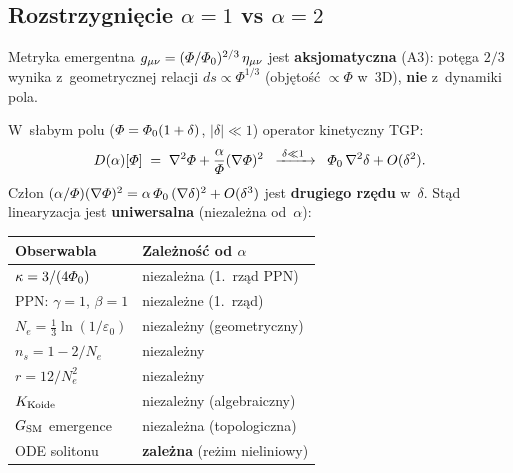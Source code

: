 \subsection{Rozstrzygnięcie $\alpha = 1$ vs $\alpha = 2$}%
\label{ssec:alpha-resolution}

\begin{result}%
\label{res:alpha-independent}
Metryka emergentna $g_{\mu\nu} = (\varPhi/\varPhi_0)^{2/3}\,\eta_{\mu\nu}$
jest \textbf{aksjomatyczna} (A3): pot\k{e}ga $2/3$ wynika z~geometrycznej
relacji $ds \propto \Phi^{1/3}$ (obj\k{e}to\'s\'c $\propto \Phi$ w~3D),
\textbf{nie} z~dynamiki pola.

W~s\l{}abym polu ($\varPhi = \varPhi_0(1 + \delta)$, $|\delta| \ll 1$)
operator kinetyczny TGP:
\begin{equation}\label{eq:D-alpha-linear}
  D(\alpha)[\varPhi] \;=\; \nabla^2\varPhi + \frac{\alpha}{\varPhi}(\nabla\varPhi)^2
  \;\;\xrightarrow{\;\delta \ll 1\;\;}\;\;
  \varPhi_0\,\nabla^2\delta + O(\delta^2).
\end{equation}
Cz\l{}on $(\alpha/\varPhi)(\nabla\varPhi)^2 = \alpha\,\varPhi_0\,(\nabla\delta)^2
+ O(\delta^3)$ jest \textbf{drugiego rz\k{e}du} w~$\delta$.
St\k{a}d linearyzacja jest \textbf{uniwersalna} (niezale\.zna od~$\alpha$):

\medskip
\begin{center}\small
\begin{tabular}{@{}ll@{}}
\toprule
\textbf{Obserwabla} & \textbf{Zale\.zno\'s\'c od $\alpha$} \\
\midrule
$\kappa = 3/(4\varPhi_0)$ & niezale\.zna (1.~rz\k{a}d PPN) \\
PPN: $\gamma = 1$, $\beta = 1$ & niezale\.zne (1.~rz\k{a}d) \\
$N_e = \tfrac{1}{3}\ln(1/\varepsilon_0)$ & niezale\.zny (geometryczny) \\
$n_s = 1 - 2/N_e$ & niezale\.zny \\
$r = 12/N_e^2$ & niezale\.zny \\
$K_{\rm Koide}$ & niezale\.zny (algebraiczny) \\
$G_{\rm SM}$ emergence & niezale\.zna (topologiczna) \\
\midrule
ODE solitonu & \textbf{zale\.zna} (re\.zim nieliniowy) \\
\bottomrule
\end{tabular}
\end{center}
\end{result}


